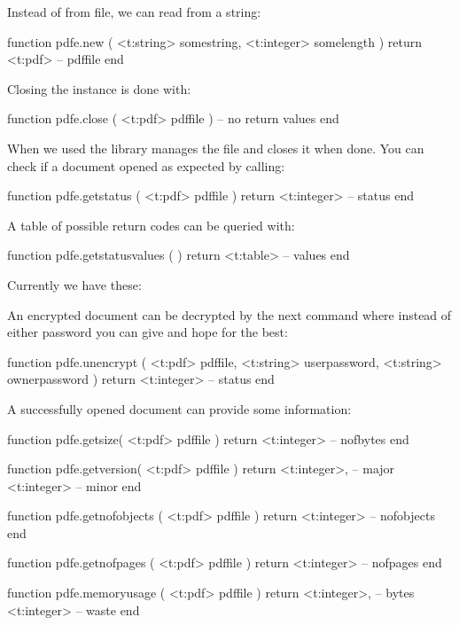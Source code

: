 Instead of from file, we can read from a string:

\starttyping[option=LUA]
function pdfe.new ( <t:string>  somestring, <t:integer> somelength )
    return <t:pdf> -- pdffile
end
\stoptyping

Closing the instance is done with:

\starttyping[option=LUA]
function pdfe.close ( <t:pdf> pdffile )
    -- no return values
end
\stoptyping

When we used  the library manages the file and closes it when
done. You can check if a document opened as expected by calling:

\starttyping[option=LUA]
function pdfe.getstatus ( <t:pdf> pdffile )
    return <t:integer> -- status
end
\stoptyping

A table of possible return codes can be queried with:

\starttyping[option=LUA]
function pdfe.getstatusvalues ( )
    return <t:table> -- values
end
\stoptyping

Currently we have these:


An encrypted document can be decrypted by the next command where instead of
either password you can give  and hope for the best:

\starttyping[option=LUA]
function pdfe.unencrypt (
    <t:pdf>    pdffile,
    <t:string> userpassword,
    <t:string> ownerpassword
)
    return <t:integer> -- status
end
\stoptyping

\stopsubsection

\startsubsection[title=Getting basic information]

A successfully opened document can provide some information:

\starttyping[option=LUA]
function pdfe.getsize( <t:pdf> pdffile )
    return <t:integer> -- nofbytes
end

function pdfe.getversion( <t:pdf> pdffile )
    return
        <t:integer>, -- major
        <t:integer>  -- minor
end

function pdfe.getnofobjects ( <t:pdf> pdffile )
    return <t:integer> -- nofobjects
end

function pdfe.getnofpages ( <t:pdf> pdffile )
    return <t:integer> -- nofpages
end

function pdfe.memoryusage ( <t:pdf> pdffile )
    return
        <t:integer>, -- bytes
        <t:integer>  -- waste
end
\stoptyping

